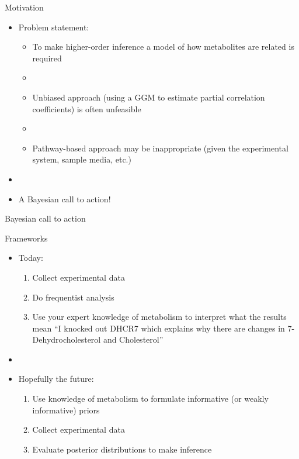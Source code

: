 \documentclass[xcolor=dvipsnames]{beamer}
\begin{document}
\begin{frame}{Motivation}
	\vspace{-15.5pt}
	\begin{itemize}
		\item Problem statement: \pause
		\begin{itemize}
			\item To make higher-order inference a model of how metabolites are related is required \pause
			\item[]
			\item Unbiased approach (using a GGM to estimate partial correlation coefficients) is often unfeasible \pause
			\item[]
			\item Pathway-based approach may be inappropriate (given the experimental system, sample media, etc.) \pause
		\end{itemize}
		\item[]
		\item A Bayesian call to action!
	\end{itemize}
\end{frame}

\begin{frame}{Bayesian call to action}
	
	{\LARGE Frameworks}
	\begin{itemize}
		\item Today: \pause
		\begin{enumerate}[{1)}]
			\item Collect experimental data \pause
			\item Do frequentist analysis \pause
			\item Use your expert knowledge of metabolism to interpret what the results mean ``I knocked out DHCR7 which explains why there are changes in 7-Dehydrocholesterol and Cholesterol'' \pause
		\end{enumerate}
		\item[]
		\item Hopefully the future:
		\begin{enumerate}[{1)}]
			\item Use knowledge of metabolism to formulate informative (or weakly informative) priors \pause
			\item Collect experimental data \pause
			\item Evaluate posterior distributions to make inference
		\end{enumerate}
	\end{itemize}
\end{frame}
\end{document}
